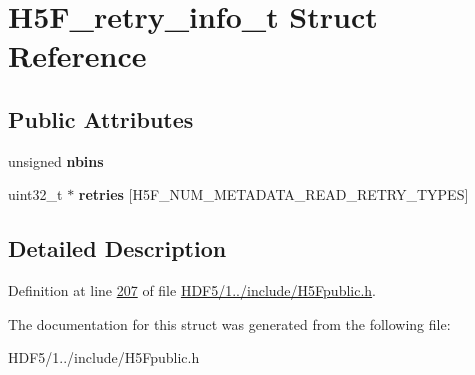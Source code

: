 \hypertarget{struct_h5_f__retry__info__t}{}\section{H5\+F\+\_\+retry\+\_\+info\+\_\+t Struct Reference}
\label{struct_h5_f__retry__info__t}
\subsection*{Public Attributes}
\begin{DoxyCompactItemize}
\item 
\mbox{\label{struct_h5_f__retry__info__t_a8d4f829a231d110d89c7fddbeec9b6d5}} 
unsigned {\bfseries nbins}
\item 
\mbox{\label{struct_h5_f__retry__info__t_a297fa48d1bb593de56bfe9cf8ece5e5d}} 
uint32\+\_\+t $\ast$ {\bfseries retries} \mbox{[}H5\+F\+\_\+\+N\+U\+M\+\_\+\+M\+E\+T\+A\+D\+A\+T\+A\+\_\+\+R\+E\+A\+D\+\_\+\+R\+E\+T\+R\+Y\+\_\+\+T\+Y\+P\+ES\mbox{]}
\end{DoxyCompactItemize}


\subsection{Detailed Description}


Definition at line \hyperlink{_h_d_f5_21_810_81_2include_2_h5_fpublic_8h_source_l00207}{207} of file \hyperlink{_h_d_f5_21_810_81_2include_2_h5_fpublic_8h_source}{H\+D\+F5/1../include/\+H5\+Fpublic.\+h}.



The documentation for this struct was generated from the following file\+:\begin{DoxyCompactItemize}
\item 
H\+D\+F5/1../include/\+H5\+Fpublic.\+h\end{DoxyCompactItemize}
